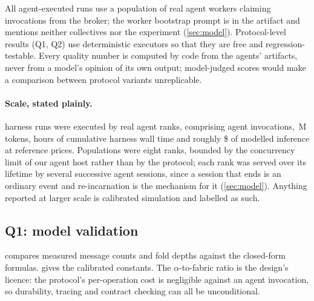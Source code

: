 \documentclass[10pt,twocolumn]{article}
\theoremstyle{definition}
\theoremstyle{plain}
\begin{document}
All agent-executed runs use a population of real agent workers claiming invocations
from the broker; the worker bootstrap prompt is in the artifact and mentions
neither collectives nor the experiment (\cref{sec:model}). Protocol-level results
(Q1, Q2) use deterministic executors so that they are free and regression-testable.
Every quality number is computed by code from the agents' artifacts, never from a
model's opinion of its own output; model-judged scores would make a comparison
between protocol variants unreplicable.

\paragraph{Scale, stated plainly.} \NRealRuns{} harness runs were executed by real agent
ranks, comprising \NAgentCallsTotal{} agent invocations, \NTokensTotal{}\,M tokens,
\NWallTotal{} hours of cumulative harness wall time and roughly \$\NSpendTotal{} of
modelled inference at reference prices. Populations were eight ranks, bounded by the
concurrency limit of our agent host rather than by the protocol; each rank was served
over its lifetime by several successive agent sessions, since a session that ends is an
ordinary event and re-incarnation is the mechanism for it (\cref{sec:model}). Anything
reported at larger scale is calibrated simulation and labelled as such.

\subsection{Q1: model validation}
\label{sec:eval-micro}

\begin{table}[t]
\centering\scriptsize

\caption{Measured versus closed-form message counts and fold depths, over every
implemented (collective, algorithm) pair at population sizes 2--16.}
\label{tab:model}
\end{table}

\begin{table}[t]
\centering\scriptsize

\caption{Cost-model constants calibrated from the translation runs. The last row is
the ratio of an agent invocation to a protocol operation, and it is why keeping
protocol state in a durable external store is free.}
\label{tab:calibration}
\end{table}

 compares measured message counts and fold depths against the
closed-form formulas.  gives the calibrated constants. The
$\alpha$-to-fabric ratio is the design's licence: the protocol's per-operation cost
is negligible against an agent invocation, so durability, tracing and contract
checking can all be unconditional.
\end{document}
